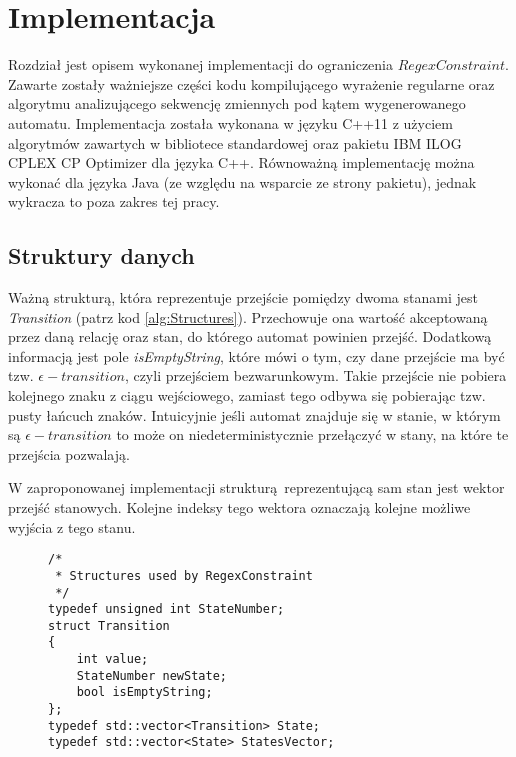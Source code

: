\chapter{Implementacja}
\thispagestyle{chapterBeginStyle}
Rozdział jest opisem wykonanej implementacji do ograniczenia $RegexConstraint$. Zawarte zostały ważniejsze części kodu kompilującego
wyrażenie regularne oraz algorytmu analizującego sekwencję zmiennych pod kątem wygenerowanego automatu. Implementacja została
wykonana w języku C++11 z użyciem algorytmów zawartych w bibliotece standardowej oraz pakietu IBM ILOG CPLEX CP Optimizer dla języka
C++. Równoważną implementację można wykonać dla języka Java (ze względu na wsparcie ze strony pakietu), jednak wykracza
to poza zakres tej pracy.


\section{Struktury danych}
\par
Ważną strukturą, która reprezentuje przejście pomiędzy dwoma stanami jest \textit{Transition} (patrz kod \ref{alg:Structures}).
Przechowuje ona wartość akceptowaną przez daną relację oraz stan, do którego automat powinien przejść. Dodatkową
informacją jest pole \textit{isEmptyString}, które mówi o tym, czy dane przejście ma być tzw. $\epsilon - transition$,
czyli przejściem bezwarunkowym. Takie przejście nie pobiera kolejnego znaku z ciągu wejściowego, zamiast tego
odbywa się pobierając tzw. pusty łańcuch znaków. Intuicyjnie jeśli automat znajduje się w stanie, w którym są
$\epsilon - transition$ to może on niedeterministycznie przełączyć w stany, na które te przejścia pozwalają.
\par
W zaproponowanej implementacji strukturą reprezentującą sam stan jest wektor przejść stanowych. Kolejne indeksy
tego wektora oznaczają kolejne możliwe wyjścia z tego stanu.

\begin{figure}
\begin{lstlisting}[caption=Struktury wykorzystywane w czasie konstruowania automatu $NFA$ oraz propagacji ograniczenia.,
    style=customc, label=alg:Structures]
/*
 * Structures used by RegexConstraint
 */
typedef unsigned int StateNumber;
struct Transition
{
    int value;
    StateNumber newState;
    bool isEmptyString;
};
typedef std::vector<Transition> State;
typedef std::vector<State> StatesVector;
\end{lstlisting}
\end{figure}


